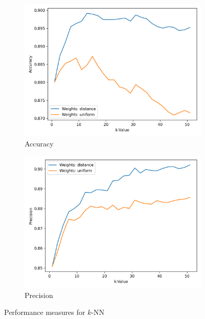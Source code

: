 \documentclass[a4paper,11pt]{article}
\begin{document}
        \begin{figure}[h!]
            \centering
            \begin{subfigure}[c]{0.45\textwidth}
                \centering
                \includegraphics[width=1\textwidth]{exercise_1/paper/figures/spambase-accuracy-kNN.png}
                \caption{Accuracy}
                \label{fig:k-NN_spambase_accurracy}
            \end{subfigure}
            \begin{subfigure}[c]{0.45\textwidth}
                \centering
                \includegraphics[width=1\textwidth]{exercise_1/paper/figures/spambase-precision-kNN.png}
                \caption{Precision}
                \label{fig:k-NN_spambase_precision}
            \end{subfigure}
            \caption{Performance measures for $k$-NN}
            \label{fig:k-NN_spambase}
        \end{figure}
    
\end{document}
